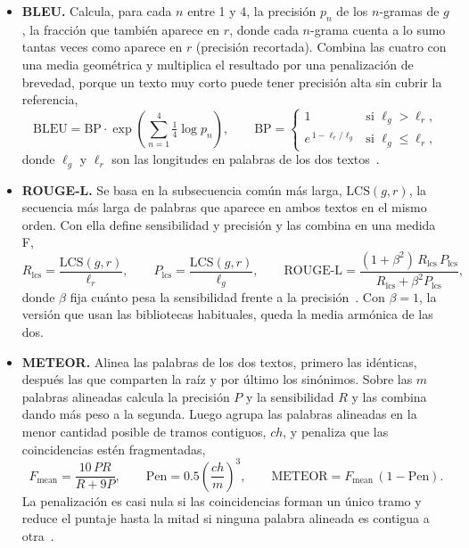 \begin{itemize}
    \item \textbf{BLEU.} Calcula, para cada $n$ entre 1 y 4, la precisión $p_n$ de los $n$-gramas de $g$, la
    fracción que también aparece en $r$, donde cada $n$-grama cuenta a lo sumo tantas veces como aparece en $r$
    (precisión recortada). Combina las cuatro con una media geométrica y multiplica el resultado
    por una penalización de brevedad, porque un texto muy corto puede tener precisión alta sin cubrir la
    referencia,
    \begin{equation}
        \mathrm{BLEU} = \mathrm{BP}\cdot\exp\!\left(\sum_{n=1}^{4} \tfrac{1}{4}\log p_n\right), \qquad
        \mathrm{BP} =
        \begin{cases}
            1 & \text{si } \ell_g > \ell_r,\\
            e^{\,1 - \ell_r/\ell_g} & \text{si } \ell_g \le \ell_r,
        \end{cases}
        \label{eq:marco_bleu}
    \end{equation}
    donde $\ell_g$ y $\ell_r$ son las longitudes en palabras de los dos textos~\cite{papineni2002bleu}.

    \item \textbf{ROUGE-L.} Se basa en la subsecuencia común más larga, $\mathrm{LCS}(g, r)$, la secuencia más
    larga de palabras que aparece en ambos textos en el mismo orden. Con ella define sensibilidad y precisión y
    las combina en una medida F,
    \begin{equation}
        R_{\mathrm{lcs}} = \frac{\mathrm{LCS}(g, r)}{\ell_r}, \qquad
        P_{\mathrm{lcs}} = \frac{\mathrm{LCS}(g, r)}{\ell_g}, \qquad
        \text{ROUGE-L} = \frac{(1+\beta^2)\,R_{\mathrm{lcs}}\,P_{\mathrm{lcs}}}{R_{\mathrm{lcs}} + \beta^2 P_{\mathrm{lcs}}},
        \label{eq:marco_rouge}
    \end{equation}
    donde $\beta$ fija cuánto pesa la sensibilidad frente a la precisión~\cite{lin2004rouge}. Con $\beta = 1$,
    la versión que usan las bibliotecas habituales, queda la media armónica de las dos.

    \item \textbf{METEOR.} Alinea las palabras de los dos textos, primero las idénticas, después las que
    comparten la raíz y por último los sinónimos. Sobre las $m$ palabras alineadas calcula la precisión $P$ y la
    sensibilidad $R$ y las combina dando más peso a la segunda. Luego agrupa las palabras alineadas en la menor
    cantidad posible de tramos contiguos, $ch$, y penaliza que las coincidencias estén fragmentadas,
    \begin{equation}
        F_{\text{mean}} = \frac{10\,P R}{R + 9P}, \qquad
        \mathrm{Pen} = 0.5\left(\frac{ch}{m}\right)^{3}, \qquad
        \mathrm{METEOR} = F_{\text{mean}}\,(1 - \mathrm{Pen}).
        \label{eq:marco_meteor}
    \end{equation}
    La penalización es casi nula si las coincidencias forman un único tramo y reduce el puntaje hasta la mitad
    si ninguna palabra alineada es contigua a otra~\cite{banerjee2005meteor}.


\end{itemize}
